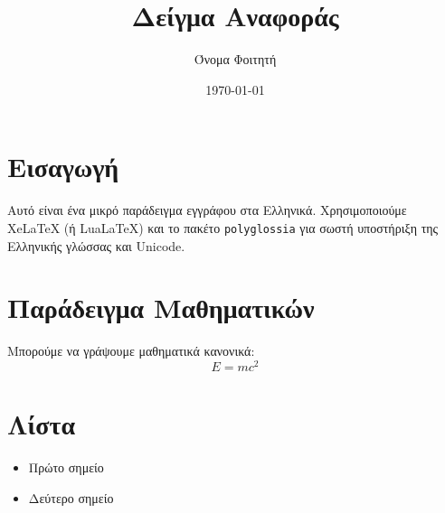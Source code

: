 \documentclass[12pt,a4paper]{article}
\title{Δείγμα Αναφοράς}
\author{Όνομα Φοιτητή}
\date{\today}
\begin{document}
\maketitle

\section{Εισαγωγή}
Αυτό είναι ένα μικρό παράδειγμα εγγράφου στα Ελληνικά. Χρησιμοποιούμε XeLaTeX (ή LuaLaTeX) και το πακέτο \texttt{polyglossia} για σωστή υποστήριξη της Ελληνικής γλώσσας και Unicode.

\section{Παράδειγμα Μαθηματικών}
Μπορούμε να γράψουμε μαθηματικά κανονικά:
\[ E = mc^2 \]

\section{Λίστα}
\begin{itemize}
  \item Πρώτο σημείο
  \item Δεύτερο σημείο
\end{itemize}
\end{document}
